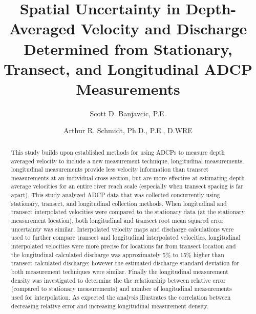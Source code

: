 \documentclass[Journal,letterpaper,BackFigs]{ascelike-new}
\begin{document}
\title{Spatial Uncertainty in Depth-Averaged Velocity and Discharge Determined from Stationary, Transect, and Longitudinal ADCP Measurements}

\author[1]{Scott D. Banjavcic, P.E.}
\author[2]{Arthur R. Schmidt, Ph.D., P.E., D.WRE}


\maketitle

\begin{abstract}
This study builds upon established methods for using ADCPs to measure depth averaged velocity to include a new measurement technique, longitudinal measurements. longitudinal measurements provide less velocity information than transect measurements at an individual cross section, but are more effective at estimating depth average velocities for an entire river reach scale (especially when transect spacing is far apart). This study analyzed ADCP data that was collected concurrently using stationary, transect, and longitudinal collection methods. When longitudinal and transect interpolated velocities were compared to the stationary data (at the stationary measurement location), both longitudinal and transect root mean squared error uncertainty was similar. Interpolated velocity maps and discharge calculations were used to further compare transect and longitudinal interpolated velocities. longitudinal interpolated velocities were more precise for locations far from transect location and the longitudinal calculated discharge was approximately 5\% to 15\% higher than transect calculated discharge; however the estimated discharge standard deviation for both measurement techniques were similar. Finally the longitudinal measurement density was investigated to determine the the relationship between relative error (compared to stationary measurements) and number of longitudinal measurements used for interpolation. As expected the analysis illustrates the correlation between decreasing relative error and increasing longitudinal measurement density. 
\end{abstract}
\end{document}
